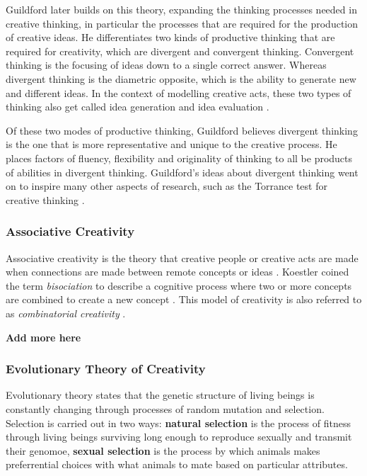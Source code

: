 Guildford later builds on this theory, expanding the thinking processes needed in creative thinking, in particular the processes that are required for the production of creative ideas.
He differentiates two kinds of productive thinking that are required for creativity, which are divergent and convergent thinking. 
Convergent thinking is the focusing of ideas down to a single correct answer. Whereas divergent thinking is the diametric opposite, which is the ability to generate new and different ideas. 
In the context of modelling creative acts, these two types of thinking also get called idea generation and idea evaluation \citep{guilford1957creative}.

Of these two modes of productive thinking, Guildford believes divergent thinking is the one that is more representative and unique to the creative process. He places factors of fluency, flexibility and originality of thinking to all be products of abilities in divergent thinking. 
Guildford's ideas about divergent thinking went on to inspire many other aspects of research, such as the Torrance test for creative thinking \citep{torrance1966torrance}.

\subsubsection{Associative Creativity}

Associative creativity is the theory that creative people or creative acts are made when connections are made between remote concepts or ideas \citep{mednick1962associative}. 
Koestler coined the term \textit{bisociation} to describe a cognitive process where two or more concepts are combined to create a new concept \citep{koestler1964act}.
This model of creativity is also referred to as \textit{combinatorial creativity} \citep{boden2004creative}.

\textbf{Add more here}

\subsubsection{Evolutionary Theory of Creativity}

Evolutionary theory states that the genetic structure of living beings is constantly changing through processes of random mutation and selection. Selection is carried out in two ways: \textbf{natural selection} is the process of fitness through living beings surviving long enough to reproduce sexually and transmit their genomoe, \textbf{sexual selection} is the process by which animals makes preferrential choices with what animals to mate based on particular attributes.

